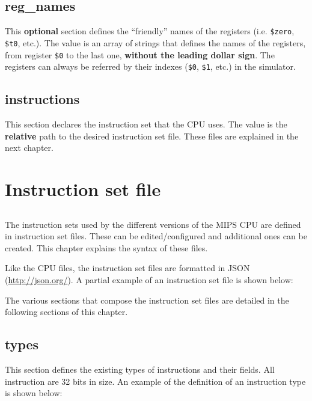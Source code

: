 \documentclass[11pt,a4paper,twoside,titlepage]{report}
\begin{document}
\section{reg\_names}

This \textbf{optional} section defines the ``friendly'' names of the registers (i.e.
\verb+$zero+, \verb+$t0+, etc.).
The value is an array of strings that defines the names of the registers, from
register \verb+$0+ to the last one, \textbf{without the leading dollar sign}.
The registers can always be referred by their indexes (\verb+$0+, \verb+$1+, etc.) 
in the simulator.


\section{instructions}

This section declares the instruction set that the CPU uses.
The value is the \textbf{relative} path to the desired instruction set file.
These files are explained in the next chapter.


\chapter{Instruction set file}

\section*{}

The instruction sets used by the different versions of the MIPS CPU
are defined in instruction set files.
These can be edited/configured and additional ones can be created.
This chapter explains the syntax of these files.

Like the CPU files, the instruction set files are formatted in 
JSON (\url{http://json.org/}).
A partial example of an instruction set file is shown below:



The various sections that compose the instruction set files are detailed in 
the following sections of this chapter.


\section{types}

This section defines the existing types of instructions and their fields.
All instruction are 32 bits in size.
An example of the definition of an instruction type is shown below:
\end{document}
